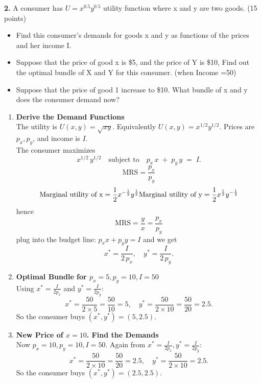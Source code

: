 \documentclass[12pt]{article}
\begin{document}
\noindent \textbf{2. } A consumer has $U= x^{0.5} y^{0.5}$ utility function where x and y are two goods. (15 points)
\begin{itemize}
    \item Find this consumer’s demands for goods x and y as functions of the prices and her income I.
\item Suppose that the price of good x is \$5, and the price of Y is \$10, Find out the optimal bundle of X and Y for this consumer. (when Income =50)
\item Suppose that the price of good 1 increase to \$10. What bundle of x and y does the consumer demand now?
\end{itemize}
\begin{enumerate}[label=(\roman*)]
    \item \textbf{Derive the Demand Functions} \\
    The utility is $U(x,y)=\sqrt{xy}$. Equivalently $U(x,y)=x^{1/2}y^{1/2}$. Prices are $p_x, p_y$, and income is $I$. \\
    The consumer maximizes
    \[
    x^{1/2}\,y^{1/2}
    \quad \text{subject to}
    \quad p_x\,x\;+\;p_y\,y \;=\;I.
    \]
    \[
 \text{MRS} = \frac{p_x}{p_y}
    \]
       \[
\text{Marginal utility of x} = \frac{1}{2}x^{-\frac{1}{2}}y^{\frac{1}{2}} \\
\text{Marginal utility of y} = \frac{1}{2}x^{\frac{1}{2}}y^{-\frac{1}{2}}
    \]
hence \[\text{MRS} = \frac{y}{x} = \frac{p_x}{p_y}\]
plug into the budget line: $p_{x} x + p_{y} y = I$ and we get
    \[
    x^* = \frac{I}{2\,p_x}, 
    \quad
    y^* = \frac{I}{2\,p_y}.
    \]

    \item \textbf{Optimal Bundle for $p_x=5, p_y=10, I=50$} \\
    Using $x^*=\tfrac{I}{2p_x}$ and $y^*=\tfrac{I}{2p_y}$:
    \[
    x^* = \frac{50}{2\times5} = \frac{50}{10} = 5,
    \quad
    y^* = \frac{50}{2\times10} = \frac{50}{20} = 2.5.
    \]
    So the consumer buys $(x^*, y^*)=(5,2.5).$

    \item \textbf{New Price of $x=10$. Find the Demands} \\
    Now $p_x=10, p_y=10, I=50.$ Again from $x^*=\tfrac{I}{2p_x}, y^*=\tfrac{I}{2p_y}$:
    \[
    x^* = \frac{50}{2\times10} = \frac{50}{20} = 2.5,
    \quad
    y^* = \frac{50}{2\times10} = 2.5.
    \]
    So the consumer buys $(x^*, y^*)=(2.5, 2.5).$

\end{enumerate}
\end{document}
